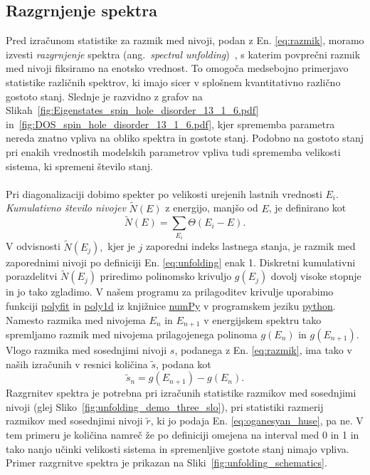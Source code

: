 \subsection{Razgrnjenje spektra}
Pred izračunom statistike za razmik med nivoji, podan z En. \eqref{eq:razmik}, moramo izvesti \emph{razgrnjenje} spektra (ang.~\emph{spectral unfolding})~\cite{abul2014unfolding}, s katerim povprečni razmik med nivoji fiksiramo na enotsko vrednost. To omogoča medsebojno primerjavo statistike različnih spektrov, ki imajo sicer v splošnem kvantitativno različno gostoto stanj. Slednje je razvidno z grafov na Slikah~\ref{fig:Eigenstates_spin_hole_disorder_13_1_6.pdf} in~\ref{fig:DOS_spin_hole_disorder_13_1_6.pdf}, kjer sprememba parametra nereda znatno vpliva na obliko spektra in gostote stanj. Podobno na gostoto stanj pri enakih vrednostih modelskih parametrov vpliva tudi sprememba velikosti sistema, ki spremeni število stanj. \\\\
Pri diagonalizaciji dobimo spekter po velikosti urejenih lastnih vrednosti $E_i$. \emph{Kumulativno število nivojev} $\tilde{N}(E)$ z energijo, manjšo od $E$, je definirano kot
\begin{equation}\label{eq:unfolding}
\tilde{N}(E)=\sum\limits_{E_i}\Theta(E_i-E).
\end{equation}
V odvisnosti $\tilde{N}(E_j),$ kjer je $j$ zaporedni indeks lastnega stanja, je razmik med zaporednimi nivoji po definiciji En. \eqref{eq:unfolding} enak 1. Diskretni kumulativni porazdelitvi $\tilde{N}(E_j)$ priredimo polinomsko krivuljo $g(E_j)$ dovolj visoke stopnje in jo tako zgladimo. V našem programu za prilagoditev krivulje uporabimo funkciji \url{polyfit} in \url{poly1d} iz knjižnice \url{numPy} v programskem jeziku \url{python}.
 Namesto razmika med nivojema $E_n$ in $E_{n+1}$ v energijskem spektru tako spremljamo razmik med nivojema prilagojenega polinoma $g(E_{n})$ in $g(E_{n+1})$. Vlogo razmika med sosednjimi nivoji $s$, podanega z En. \eqref{eq:razmik}, ima tako v naših izračunih v resnici količina $\tilde{s}$, podana kot
$$
\tilde{s}_n=g(E_{n+1})-g(E_n).
$$
Razgrnitev spektra je potrebna pri izračunih statistike razmikov med sosednjimi nivoji (glej Sliko~\ref{fig:unfolding_demo_three_slo}), pri statistiki razmerij razmikov med sosednjimi nivoji $\tilde{r}$, ki jo podaja En. \eqref{eq:oganesyan_huse}, pa ne. V tem primeru je količina namreč že po definiciji omejena na interval med 0 in 1 in tako nanjo učinki velikosti sistema in spremenljive gostote stanj nimajo vpliva. Primer razgrnitve spektra je prikazan na Sliki~\ref{fig:unfolding_schematics}.
